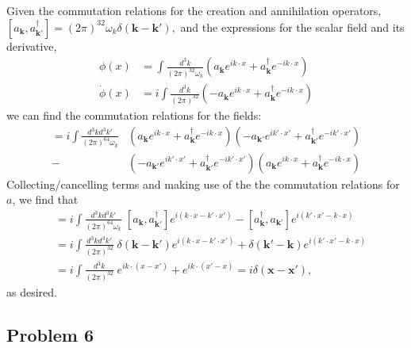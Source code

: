 \documentclass{mathnotes}
\begin{document}
Given the commutation relations for the creation and annihilation operators, $[a_{\mathbf{k}},a^\dagger_{\mathbf{k}'}]=(2\pi)^32\omega_k\delta(\mathbf{k}-\mathbf{k}'),$
and the expressions for the scalar field and its derivative,
\begin{align*}
    \phi(x)&=\int\frac{d^3k}{(2\pi)^32\omega_k}\left( a_\mathbf{k}e^{ik\cdot x} + a^\dagger_\mathbf{k}e^{-ik\cdot x} \right)\\
    \dot{\phi}(x)&=i\int\frac{d^3k}{(2\pi)^32}\left(-a_\mathbf{k}e^{ik\cdot x} + a^\dagger_\mathbf{k}e^{-ik\cdot x} \right)
\end{align*}
we can find the commutation relations for the fields:
\begin{align*}
    [\phi(t,\mathbf{x}),\dot{\phi}(t,\mathbf{x}')]=i\int \frac{d^3k d^3k'}{(2\pi)^64\omega_k}&\left( a_\mathbf{k}e^{ik\cdot x} + a^\dagger_\mathbf{k}e^{-ik\cdot x} \right)
    \left( -a_\mathbf{k'}e^{ik'\cdot x'} + a^\dagger_\mathbf{k'}e^{-ik'\cdot x'} \right)\\
    -&\left(-a_\mathbf{k'}e^{ik'\cdot x'} + a^\dagger_\mathbf{k'}e^{-ik'\cdot x'} \right)
    \left(a_\mathbf{k}e^{ik\cdot x} + a^\dagger_\mathbf{k}e^{-ik\cdot x} \right)
\end{align*}
Collecting/cancelling terms and making use of the the commutation relations for $a$, we find that
\begin{align*}
    [\phi(t,\mathbf{x}),\dot{\phi}(t,\mathbf{x}')]&=i\int \frac{d^3k d^3k'}{(2\pi)^64\omega_k}\;[a_\mathbf{k},a^\dagger_{\mathbf{k'}}]e^{i(k\cdot x-k'\cdot x')}
    - [a^\dagger_{\mathbf{k}},a_{\mathbf{k}'}]e^{i(k'\cdot x'-k\cdot x)}\\
    &=i\int \frac{d^3k d^3k'}{(2\pi)^32}\;\delta(\mathbf{k}-\mathbf{k}')e^{i(k\cdot x-k'\cdot x')}+\delta(\mathbf{k}'-\mathbf{k})e^{i(k'\cdot x'-k\cdot x)}\\
    &=i\int \frac{d^3k}{(2\pi)^32}\;e^{ik\cdot(x-x')}+e^{ik\cdot(x'-x)}=i\delta(\mathbf{x}-\mathbf{x}'),
\end{align*}
as desired.

\subsection*{Problem 6}
\end{document}
